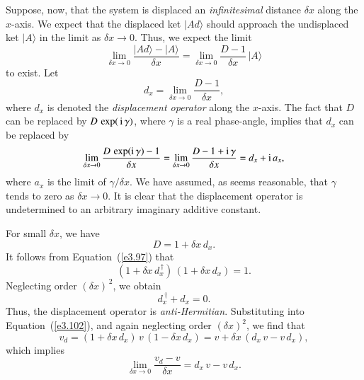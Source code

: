 Suppose, now, that the system is displaced an {\em infinitesimal} distance $\delta x$
along the $x$-axis. We expect that the displaced ket $|A d\rangle$ should
approach the undisplaced ket 
$|A\rangle$ in the limit as $\delta x\rightarrow 0$. Thus,
we expect the limit
\begin{equation}
\lim_{\delta x\rightarrow 0 } \frac{|A d\rangle - |A\rangle}{\delta x}
= \lim_{\delta x\rightarrow 0 }\frac{D-1}{\delta x}\,|A\rangle
\end{equation}
to exist. Let
\begin{equation}
d_x =  \lim_{\delta x\rightarrow 0 }\frac{D-1}{\delta x},
\end{equation}
where $d_x$ is denoted the {\em displacement operator}\/ along the $x$-axis. The fact 
that $D$ can be replaced by $D \,\exp(\,{\rm i}\,\gamma)$, where $\gamma$ is a real
phase-angle, implies that $d_x$ can be replaced by
\begin{equation}
 \lim_{\delta x\rightarrow 0 }\frac{D\,\exp({\rm i}\,\gamma)-1}{\delta x}=
 \lim_{\delta x\rightarrow 0 }\frac{D-1+{\rm i}\, \gamma}{\delta x}= d_x + {\rm i}\,a_x,
\end{equation}
where $a_x$ is the limit of $\gamma/\delta x$. We have assumed, as seems
reasonable,  that $\gamma$ tends
to zero as $\delta x\rightarrow 0$. It is clear that the displacement operator
is undetermined to an arbitrary imaginary additive constant. 

For small $\delta x$, we have
\begin{equation}\label{e3.106}
D = 1 + \delta x\,d_x.
\end{equation}
It follows from Equation~(\ref{e3.97}) that
\begin{equation}
(1+ \delta x\,d_x^{\,\dag}) \,(1+  \delta x\,d_x) = 1.
\end{equation}
Neglecting order $(\delta x)^{\,2}$, we obtain
\begin{equation}
d_x^{~\dag} + d_x = 0.
\end{equation}
Thus, the displacement operator is {\em anti-Hermitian}. Substituting into
Equation~(\ref{e3.102}), and again neglecting order $(\delta x)^2$, we find that
\begin{equation}
v_d = (1+ \delta x\,d_x)\, v\, (1- \delta x\,d_x) = v + \delta x\,( d_x\, v - v\, d_x),
\end{equation}
which implies
\begin{equation}\label{e3.110}
\lim_{\delta x\rightarrow 0} \frac{v_d -v}{\delta x} = d_x \,v -v\, d_x.
\end{equation}

